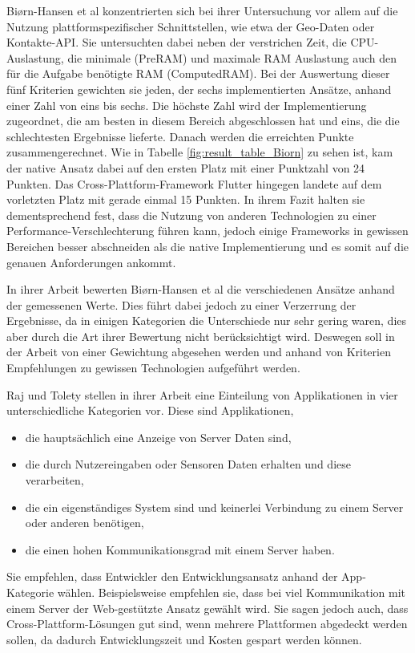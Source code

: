 Biørn-Hansen et al \cite{BirnHansen.2020} konzentrierten sich bei ihrer Untersuchung vor allem auf die Nutzung plattformspezifischer Schnittstellen, wie etwa der Geo-Daten oder Kontakte-API. Sie untersuchten dabei neben der verstrichen Zeit, die CPU-Auslastung, die minimale (PreRAM) und maximale RAM Auslastung auch den für die Aufgabe benötigte RAM (ComputedRAM). Bei der Auswertung dieser fünf Kriterien gewichten sie jeden, der sechs implementierten Ansätze, anhand einer Zahl von eins bis sechs. Die höchste Zahl wird der Implementierung zugeordnet, die am besten in diesem Bereich abgeschlossen hat und eins, die die schlechtesten Ergebnisse lieferte. Danach werden die erreichten Punkte zusammengerechnet. Wie in Tabelle \ref{fig:result_table_Biorn} zu sehen ist, kam der native Ansatz dabei auf den ersten Platz mit einer Punktzahl von 24 Punkten. Das Cross-Plattform-Framework Flutter hingegen landete auf dem vorletzten Platz mit gerade einmal 15 Punkten. In ihrem Fazit halten sie dementsprechend fest, dass die Nutzung von anderen Technologien zu einer Performance-Verschlechterung führen kann, jedoch einige Frameworks in gewissen Bereichen besser abschneiden als die native Implementierung und es somit auf die genauen Anforderungen ankommt.

In ihrer Arbeit bewerten Biørn-Hansen et al \cite{BirnHansen.2020} die verschiedenen Ansätze anhand der gemessenen Werte. Dies führt dabei jedoch zu einer Verzerrung der Ergebnisse, da in einigen Kategorien die Unterschiede nur sehr gering waren, dies aber durch die Art ihrer Bewertung nicht berücksichtigt wird. Deswegen soll in der Arbeit von einer Gewichtung abgesehen werden und anhand von Kriterien Empfehlungen zu gewissen Technologien aufgeführt werden.

Raj und Tolety \cite{IEEE_Rahul_Seshu} stellen in ihrer Arbeit eine Einteilung von Applikationen in vier unterschiedliche Kategorien vor. Diese sind Applikationen,
\begin{itemize}
    \item die hauptsächlich eine Anzeige von Server Daten sind,
    \item die durch Nutzereingaben oder Sensoren Daten erhalten und diese verarbeiten,
    \item die ein eigenständiges System sind und keinerlei Verbindung zu einem Server oder anderen benötigen,
    \item die einen hohen Kommunikationsgrad mit einem Server haben.
\end{itemize}
Sie empfehlen, dass Entwickler den Entwicklungsansatz anhand der App-Kategorie wählen. Beispielsweise empfehlen sie, dass bei viel Kommunikation mit einem Server der Web-gestützte Ansatz gewählt wird. Sie sagen jedoch auch, dass Cross-Plattform-Lösungen gut sind, wenn mehrere Plattformen abgedeckt werden sollen, da dadurch Entwicklungszeit und Kosten gespart werden können.


